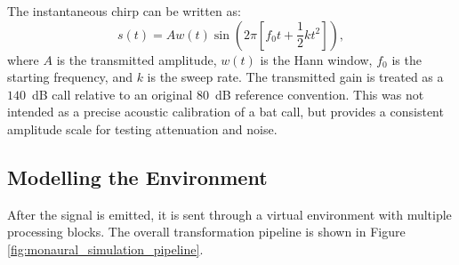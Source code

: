 The instantaneous chirp can be written as:
\begin{equation}
    s(t) = A w(t)\sin\left(2\pi\left[f_0 t + \frac{1}{2}kt^2\right]\right),
\end{equation}
where $A$ is the transmitted amplitude, $w(t)$ is the Hann window, $f_0$ is the starting frequency, and $k$ is the sweep rate. The transmitted gain is treated as a $140$~dB call relative to an original $80$~dB reference convention. This was not intended as a precise acoustic calibration of a bat call, but provides a consistent amplitude scale for testing attenuation and noise.

\subsection{Modelling the Environment}

After the signal is emitted, it is sent through a virtual environment with multiple processing blocks. The overall transformation pipeline is shown in Figure \ref{fig:monaural_simulation_pipeline}.


